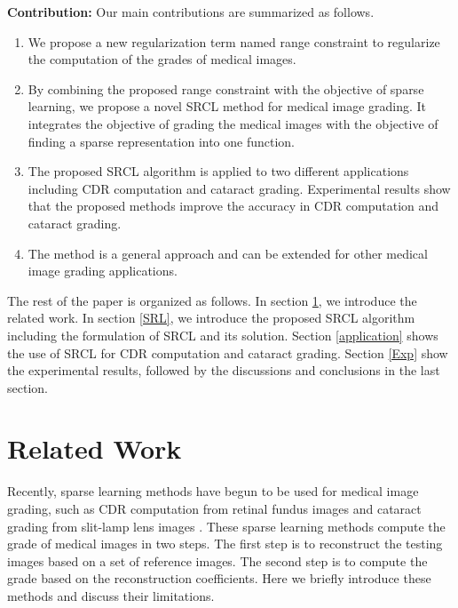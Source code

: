\documentclass[journal]{IEEEtran}
\begin{document}
    \textbf{Contribution:} Our main contributions are summarized as
    follows.

     \begin{enumerate}
     	 \item We propose a new regularization term named range constraint to regularize the computation of the grades of medical images.
     	\item By combining the proposed range constraint with the objective of sparse learning, we propose a novel    SRCL method for medical image grading. It integrates the   objective of grading the medical images with the objective of finding a sparse representation into one function.
     	 \item The proposed SRCL algorithm is applied to two different applications including CDR computation   and cataract grading.
     	  Experimental results show that the proposed methods improve the accuracy in  CDR computation and cataract grading.
     	\item The method is a general approach and can be extended for other medical image grading applications.


     \end{enumerate}

     The rest of the paper is organized as follows. In section \ref{related}, we introduce the related work. In section \ref{SRL}, we introduce  the proposed  SRCL algorithm including the formulation of SRCL and its solution.  Section \ref{application}
     shows the use of SRCL for CDR computation  and cataract grading.
     Section \ref{Exp} show the experimental results, followed by the discussions and conclusions in the last section.

     \section{Related Work} \label{related}
   Recently, sparse learning methods have begun to be used for medical image grading, such as CDR computation from retinal fundus images \cite{YW13, CJ15, Cheng:17BOE} and cataract grading from slit-lamp lens images \cite{Xu13}.  These sparse learning methods compute the grade of medical images in two steps. The first step is to  reconstruct the testing  images based on a set of reference   images. The second step is to compute the grade based on the reconstruction coefficients. Here we briefly introduce these methods and discuss their limitations.
\end{document}

